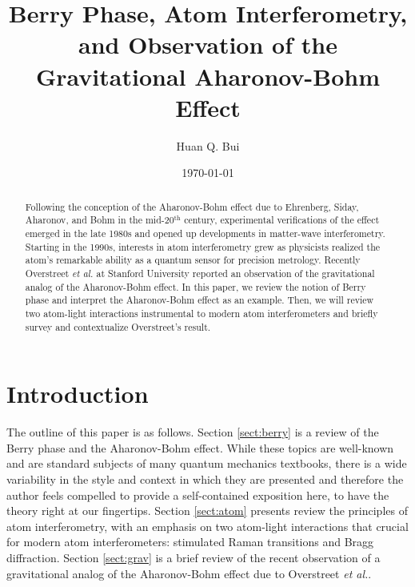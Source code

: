 \documentclass[reprint,
nofootinbib,
amsmath,amssymb,
aps]{revtex4-1}
\begin{document}
	
	
	

\title{Berry Phase, Atom Interferometry,\\ and Observation of the Gravitational Aharonov-Bohm Effect}
\author{Huan Q. Bui}
\date{\today}


\begin{abstract}
	Following the conception of the Aharonov-Bohm effect due to Ehrenberg, Siday, Aharonov, and Bohm in the mid-20$^\text{th}$ century, experimental verifications of the effect emerged in the late 1980s and opened up developments in matter-wave interferometry. Starting in the 1990s, interests in atom interferometry grew as physicists realized the atom's remarkable ability as a quantum sensor for precision metrology. Recently Overstreet \textit{et al.} at Stanford University reported an observation of the gravitational analog of the Aharonov-Bohm effect. In this paper, we review the notion of Berry phase and interpret the Aharonov-Bohm effect as an example. Then, we will review two atom-light interactions instrumental to modern atom interferometers and briefly survey and contextualize Overstreet's result.
\end{abstract}

\maketitle




\section{Introduction}


The outline of this paper is as follows.  Section \ref{sect:berry} is a review of the Berry phase and the Aharonov-Bohm effect. While these topics are well-known and are standard subjects of many quantum mechanics textbooks, there is a wide variability in the style and context in which they are presented and therefore the author feels compelled to provide a self-contained exposition here, to have the theory right at our fingertips. Section \ref{sect:atom} presents review the principles of atom interferometry, with an emphasis on two atom-light interactions that crucial for modern atom interferometers: stimulated Raman transitions and Bragg diffraction. Section \ref{sect:grav} is a brief review of the recent observation of a gravitational analog of the Aharonov-Bohm effect due to Overstreet \textit{et al.}.
\end{document}
